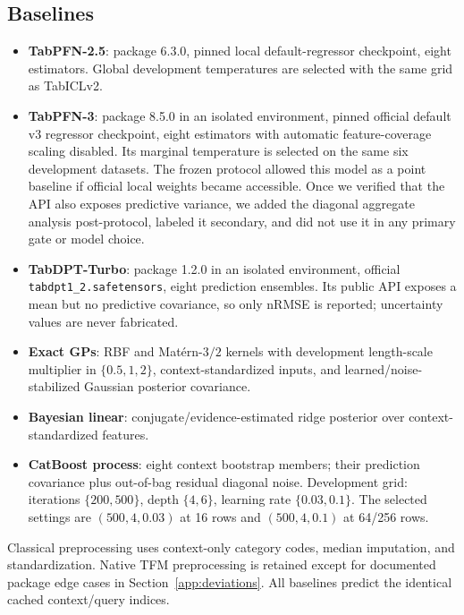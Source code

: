 \subsection{Baselines}

\begin{itemize}
  \item \textbf{TabPFN-2.5}: package 6.3.0, pinned local default-regressor
  checkpoint, eight estimators.  Global development temperatures are selected
  with the same grid as TabICLv2.
  \item \textbf{TabPFN-3}: package 8.5.0 in an isolated environment, pinned
  official default v3 regressor checkpoint, eight estimators with automatic
  feature-coverage scaling disabled.  Its marginal temperature is selected on
  the same six development datasets.  The frozen protocol allowed this model
  as a point baseline if official local weights became accessible.  Once we
  verified that the API also exposes predictive variance, we added the
  diagonal aggregate analysis post-protocol, labeled it secondary, and did not
  use it in any primary gate or model choice.
  \item \textbf{TabDPT-Turbo}: package 1.2.0 in an isolated environment,
  official \texttt{tabdpt1\_2.safetensors}, eight prediction ensembles.  Its
  public API exposes a mean but no predictive covariance, so only nRMSE is
  reported; uncertainty values are never fabricated.
  \item \textbf{Exact GPs}: RBF and Mat\'ern-$3/2$ kernels with development
  length-scale multiplier in $\{0.5,1,2\}$, context-standardized inputs, and
  learned/noise-stabilized Gaussian posterior covariance.
  \item \textbf{Bayesian linear}: conjugate/evidence-estimated ridge posterior
  over context-standardized features.
  \item \textbf{CatBoost process}: eight context bootstrap members; their
  prediction covariance plus out-of-bag residual diagonal noise.  Development
  grid: iterations $\{200,500\}$, depth $\{4,6\}$, learning rate
  $\{0.03,0.1\}$.  The selected settings are $(500,4,0.03)$ at 16 rows and
  $(500,4,0.1)$ at 64/256 rows.
\end{itemize}

Classical preprocessing uses context-only category codes, median imputation,
and standardization.  Native TFM preprocessing is retained except for
documented package edge cases in Section~\ref{app:deviations}.  All baselines
predict the identical cached context/query indices.

